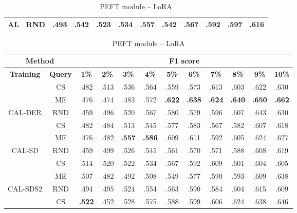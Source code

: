 \begin{table}[htbp]
\begin{subtable}{\linewidth}
\begin{tabular}{c|c|cccccccccc}
\multirow{-3}{*}{\raggedright\arraybackslash AL} & RND & .493 & .542 & .523 & .534 & .557 & .542 & .567 & .592 & .597 & .616\\
\bottomrule
\end{tabular}
\end{subtable}
\vspace{1em}
\begin{subtable}{\linewidth}
\centering
\caption{PEFT module -- LoRA}

\begin{tabular}{c|c|cccccccccc}
\toprule
\multicolumn{2}{c|}{\textbf{Method}} & \multicolumn{10}{c}{\textbf{F1 score}} \\
\midrule
\textbf{Training} & \textbf{Query} & \textbf{1\%} & \textbf{2\%} & \textbf{3\%} & \textbf{4\%} & \textbf{5\%} & \textbf{6\%} & \textbf{7\%} & \textbf{8\%} & \textbf{9\%} & \textbf{10\%}\\
\midrule
 & CS & .482 & .513 & .536 & .564 & .559 & .573 & .613 & .603 & .622 & .630\\

 & ME & .476 & .474 & .483 & .572 & \textbf{.622} & \textbf{.638} & \textbf{.624} & \textbf{.640} & \textbf{.650} & \textbf{.662}\\

\multirow{-3}{*}{\raggedright\arraybackslash CAL-DER} & RND & .459 & .496 & .520 & .567 & .580 & .579 & .596 & .607 & .643 & .630\\
\midrule
 & CS & .482 & .484 & .513 & .545 & .577 & .583 & .567 & .582 & .607 & .618\\

 & ME & .476 & .482 & \textbf{.557} & \textbf{.586} & .609 & .611 & .592 & .605 & .624 & .627\\

\multirow{-3}{*}{\raggedright\arraybackslash CAL-SD} & RND & .459 & .499 & .526 & .545 & .561 & .570 & .571 & .588 & .608 & .619\\
\midrule
 & CS & .514 & .520 & .522 & .534 & .567 & .592 & .609 & .601 & .604 & .605\\

 & ME & .507 & .482 & .492 & .508 & .549 & .577 & .590 & .593 & .609 & .638\\

\multirow{-3}{*}{\raggedright\arraybackslash CAL-SDS2} & RND & .494 & .495 & .524 & .554 & .563 & .590 & .584 & .604 & .615 & .609\\
\midrule
 & CS & \textbf{.522} & .452 & .528 & .575 & .588 & .599 & .606 & .624 & .638 & .646\\


\end{tabular}
\end{subtable}
\end{table}
